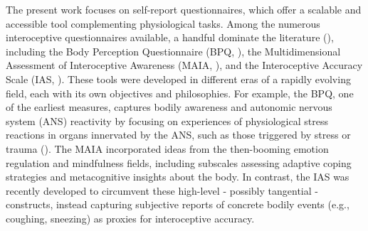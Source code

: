 \documentclass[
  jou,
  floatsintext,
  longtable,
  nolmodern,
  notxfonts,
  notimes,
  colorlinks=true,linkcolor=blue,citecolor=blue,urlcolor=blue]{apa7}
\begin{document}
The present work focuses on self-report questionnaires, which offer a
scalable and accessible tool complementing physiological tasks. Among
the numerous interoceptive questionnaires available, a handful dominate
the literature (), including the Body Perception Questionnaire (BPQ,
), the
Multidimensional Assessment of Interoceptive Awareness (MAIA,
), and
the Interoceptive Accuracy Scale (IAS,
). These tools
were developed in different eras of a rapidly evolving field, each with
its own objectives and philosophies. For example, the BPQ, one of the
earliest measures, captures bodily awareness and autonomic nervous
system (ANS) reactivity by focusing on experiences of physiological
stress reactions in organs innervated by the ANS, such as those
triggered by stress or trauma (). The MAIA incorporated ideas from the then-booming emotion
regulation and mindfulness fields, including subscales assessing
adaptive coping strategies and metacognitive insights about the body. In
contrast, the IAS was recently developed to circumvent these high-level
- possibly tangential - constructs, instead capturing subjective reports
of concrete bodily events (e.g., coughing, sneezing) as proxies for
interoceptive accuracy.
\end{document}
